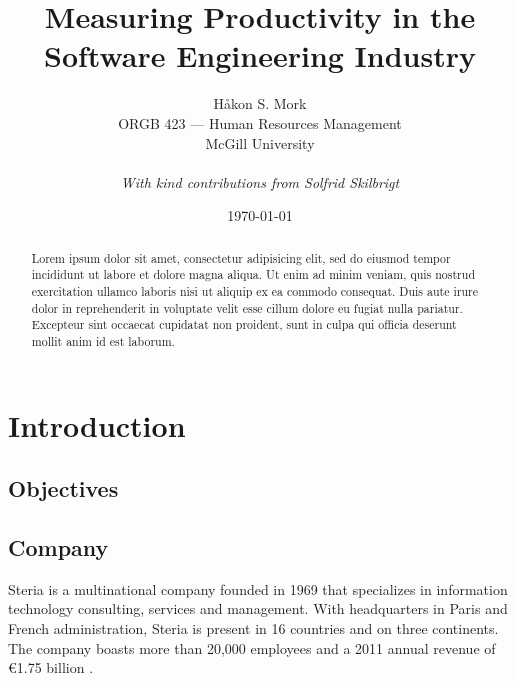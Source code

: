 \documentclass[letterpaper, 10pt]{report}
\title{\Huge \textbf{Measuring Productivity in the Software Engineering Industry}}
\author{
	Håkon S. Mork \\ 
	ORGB 423 --- Human Resources Management \\ 
	McGill University \\
	\\
	\emph{With kind contributions from Solfrid Skilbrigt}
}
\date{\today}
\begin{document}
\maketitle

\begin{abstract}
Lorem ipsum dolor sit amet, consectetur adipisicing elit, sed do eiusmod tempor incididunt ut labore et dolore magna aliqua. Ut enim ad minim veniam, quis nostrud exercitation ullamco laboris nisi ut aliquip ex ea commodo consequat. Duis aute irure dolor in reprehenderit in voluptate velit esse cillum dolore eu fugiat nulla pariatur. Excepteur sint occaecat cupidatat non proident, sunt in culpa qui officia deserunt mollit anim id est laborum.
\end{abstract}

\tableofcontents

\chapter{Introduction}

\section{Objectives}

\section{Company}
Steria is a multinational company founded in 1969 that specializes in information technology consulting, services and management. 
With headquarters in Paris and French administration, Steria is present in 16 countries and on three continents. 
The company boasts more than 20,000 employees and a 2011 annual revenue of €1.75 billion \parencite{steria:stats}.

\end{document}
